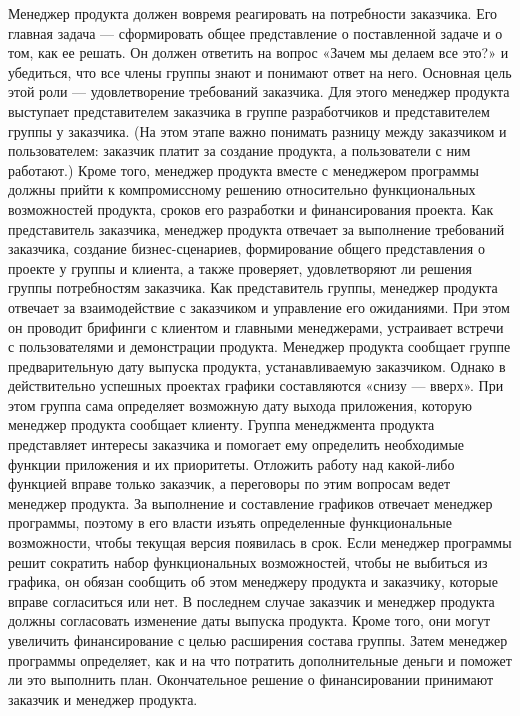 \documentclass{../industrial-development}
\begin{document}
Менеджер продукта должен вовремя реагировать на потребности заказчика. Его главная задача — сформировать общее представление о поставленной задаче и о том, как ее решать. Он должен ответить на вопрос «Зачем мы делаем все это?» и убедиться, что все члены группы знают и понимают ответ на него.
Основная цель этой роли — удовлетворение требований заказчика. Для этого менеджер продукта выступает представителем заказчика в группе разработчиков и представителем группы у заказчика. (На этом этапе важно понимать разницу между заказчиком и пользователем: заказчик платит за создание продукта, а пользователи с ним работают.) Кроме того, менеджер продукта вместе с менеджером про­граммы должны прийти к компромиссному решению относительно функциональных возможностей продукта, сроков его разработки и финансирования проекта.
Как представитель заказчика, менеджер продукта отвечает за выполнение требований заказчика, создание бизнес-сценариев, формирование общего представления о проекте у группы и клиента, а также проверяет, удовлетворяют ли решения группы потребностям заказчика.
Как представитель группы, менеджер продукта отвечает за взаимодействие с заказчиком и управление его ожиданиями. При этом он проводит брифинги с клиентом и главными менеджерами, устраивает встречи с пользователями и демонстрации продукта.
Менеджер продукта сообщает группе предварительную дату выпуска продукта, устанавливаемую заказчиком. Однако в действительно успешных проектах графики составляются «снизу — вверх». При этом группа сама определяет возможную дату выхода приложения, которую менеджер продукта сообщает клиенту.
Группа менеджмента продукта представляет интересы заказчика и помогает ему определить необходимые функции приложения и их приоритеты. Отложить работу над какой-либо функцией вправе только заказчик, а переговоры по этим вопросам ведет менеджер продукта. За выполнение и составление графиков отвечает менеджер программы, поэтому в его власти изъять определенные функциональные возможности, чтобы текущая версия появилась в срок. Если менеджер программы решит сократить набор функциональных возможностей, чтобы не выбиться из графика,
он обязан сообщить об этом менеджеру продукта и заказчику, которые вправе согласиться или нет. В последнем случае заказчик и менеджер продукта должны согласовать изменение даты выпуска продукта. Кроме того, они могут увеличить финансирование с целью расширения состава группы. Затем менеджер программы определяет, как и на что потратить дополнительные деньги и поможет ли это выполнить план. Окончательное решение о финансировании принимают заказчик и менеджер продукта.
  ~\cite{Collective}
\end{document}
